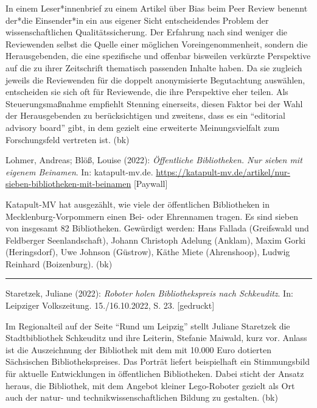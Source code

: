 \documentclass[a4paper,
fontsize=11pt,
oneside,
numbers=noperiodatend,
parskip=half-,
bibliography=totoc,
final
]{scrartcl}
\begin{document}
In einem Leser*innenbrief zu einem Artikel über Bias beim Peer Review
benennt der*die Einsender*in ein aus eigener Sicht entscheidendes
Problem der wissenschaftlichen Qualitätssicherung. Der Erfahrung nach
sind weniger die Reviewenden selbst die Quelle einer möglichen
Voreingenommenheit, sondern die Herausgebenden, die eine spezifische und
offenbar bisweilen verkürzte Perspektive auf die zu ihrer Zeitschrift
thematisch passenden Inhalte haben. Da sie zugleich jeweils die
Reviewenden für die doppelt anonymisierte Begutachtung auswählen,
entscheiden sie sich oft für Reviewende, die ihre Perspektive eher
teilen. Als Steuerungsmaßnahme empfiehlt Stenning einerseits, diesen
Faktor bei der Wahl der Herausgebenden zu berücksichtigen und zweitens,
dass es ein \enquote{editorial advisory board} gibt, in dem gezielt eine
erweiterte Meinungsvielfalt zum Forschungsfeld vertreten ist. (bk)


Lohmer, Andreas; Blöß, Louise (2022): \emph{Öffentliche Bibliotheken.
Nur sieben mit eigenem Beinamen}. In: katapult-mv.de.
\url{https://katapult-mv.de/artikel/nur-sieben-bibliotheken-mit-beinamen}
{[}Paywall{]}

Katapult-MV hat ausgezählt, wie viele der öffentlichen Bibliotheken in
Mecklenburg-Vorpommern einen Bei- oder Ehrennamen tragen. Es sind sieben
von insgesamt 82 Bibliotheken. Gewürdigt werden: Hans Fallada
(Greifswald und Feldberger Seenlandschaft), Johann Christoph Adelung
(Anklam), Maxim Gorki (Heringsdorf), Uwe Johnson (Güstrow), Käthe Miete
(Ahrenshoop), Ludwig Reinhard (Boizenburg). (bk)

\begin{center}\rule{0.5\linewidth}{0.5pt}\end{center}

Staretzek, Juliane (2022): \emph{Roboter holen Bibliothekspreis nach
Schkeuditz}. In: Leipziger Volkszeitung. 15./16.10.2022, S. 23.
{[}gedruckt{]}

Im Regionalteil auf der Seite \enquote{Rund um Leipzig} stellt Juliane
Staretzek die Stadtbibliothek Schkeuditz und ihre Leiterin, Stefanie
Maiwald, kurz vor. Anlass ist die Auszeichnung der Bibliothek mit dem
mit 10.000 Euro dotierten Sächsischen Bibliothekspreises. Das Porträt
liefert beispielhaft ein Stimmungsbild für aktuelle Entwicklungen in
öffentlichen Bibliotheken. Dabei sticht der Ansatz heraus, die
Bibliothek, mit dem Angebot kleiner Lego-Roboter gezielt als Ort auch
der natur- und technikwissenschaftlichen Bildung zu gestalten. (bk)
\end{document}
